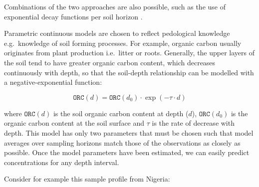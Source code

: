 \documentclass[graybox,natbib,nospthms,UStrade]{svmono}
\begin{document}
Combinations of the two approaches are also possible, such as the use of
exponential decay functions per soil horizon \citep{Kempen2011Geoderma}.

Parametric continuous models are chosen to reflect pedological knowledge
e.g.~knowledge of soil forming processes. For example, organic carbon
usually originates from plant production i.e.~litter or roots. Generally,
the upper layers of the soil tend to have greater organic carbon
content, which decreases continuously with depth, so that the soil-depth
relationship can be modelled with a negative-exponential function:

\begin{equation}
{\texttt{ORC}} (d) = {\texttt{ORC}} (d_0) \cdot \exp(-\tau \cdot d)
\label{eq:SOMdepth}
\end{equation}

where \(\texttt{ORC}(d)\) is the soil organic carbon content at depth
(\(d\)), \({\texttt{ORC}} (d_0)\) is the organic carbon content at the soil
surface and \(\tau\) is the rate of decrease with depth. This model has
only two parameters that must be chosen such that model averages over
sampling horizons match those of the observations as closely as
possible. Once the model parameters have been estimated, we can easily
predict concentrations for any depth interval.

Consider for example this sample profile from Nigeria:
\end{document}
